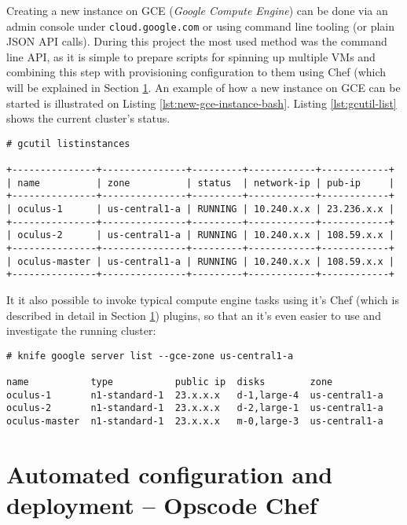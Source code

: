Creating a new instance on GCE (\textit{Google Compute Engine}) can be done via an admin console under \verb|cloud.google.com| or using command line tooling (or plain JSON API calls). During this project the most used method was the command line API, as it is simple to prepare scripts for spinning up multiple VMs and combining this step with provisioning configuration to them using Chef (which will be explained in Section \ref{sec:automated-conf-provisioning}. An example of how a new instance on GCE can be started is illustrated on Listing \ref{lst:new-gce-instance-bash}. Listing \ref{lst:gcutil-list} shows the current cluster's status.

\label{lst:gcutil-list}
\begin{verbatim}
# gcutil listinstances

+---------------+---------------+---------+------------+------------+
| name          | zone          | status  | network-ip | pub-ip     |
+---------------+---------------+---------+------------+------------+
| oculus-1      | us-central1-a | RUNNING | 10.240.x.x | 23.236.x.x |
+---------------+---------------+---------+------------+------------+
| oculus-2      | us-central1-a | RUNNING | 10.240.x.x | 108.59.x.x |
+---------------+---------------+---------+------------+------------+
| oculus-master | us-central1-a | RUNNING | 10.240.x.x | 108.59.x.x |
+---------------+---------------+---------+------------+------------+
\end{verbatim}

It it also possible to invoke typical compute engine tasks using it's Chef (which is described in detail in Section \ref{sec:automated-conf-provisioning}) plugins, so that an it's even easier to use and investigate the running cluster:

\begin{verbatim}
# knife google server list --gce-zone us-central1-a

name           type           public ip  disks        zone           
oculus-1       n1-standard-1  23.x.x.x   d-1,large-4  us-central1-a  
oculus-2       n1-standard-1  23.x.x.x   d-2,large-1  us-central1-a  
oculus-master  n1-standard-1  23.x.x.x   m-0,large-3  us-central1-a  
\end{verbatim}



\newpage
\section{Automated configuration and deployment -- Opscode Chef}
\label{sec:automated-conf-provisioning}

